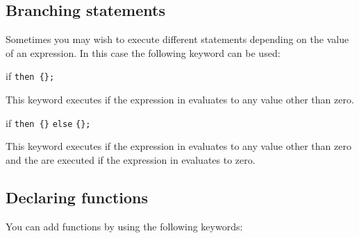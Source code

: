 	
	


\subsection{Branching statements}

	Sometimes you may wish to execute different statements
	depending on the value of an expression. In this
	case the following keyword can be used:

\begin{math-keyword}{{if}  \texttt{then \{}\texttt{\};}}

	This keyword executes  if the expression in 
	evaluates to any value other than zero.

\end{math-keyword}

\begin{math-keyword}{{if}  \texttt{then \{}\texttt{\}} \texttt{else} \texttt{\{}\texttt{\}}\texttt{;}}

	This keyword executes  if the expression in 
	evaluates to any value other than zero and the  are executed if
	the expression in  evaluates to zero.

\begin{codeexample}[]
\end{codeexample}
\end{math-keyword}

\subsection{Declaring functions}

	You can add functions by using the following keywords:


